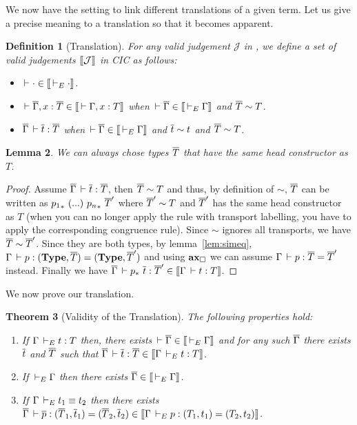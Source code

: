 \documentclass[11pt]{article}
\theoremstyle{plain}
\newtheorem{theorem}{Theorem}%
\newtheorem{lemma}[theorem]{Lemma}
\newtheorem{definition}[theorem]{Definition}
\theoremstyle{remark}
\begin{document}
We now have the setting to link different translations of a given term.
Let us give a precise meaning to a translation so that it becomes apparent.

\begin{definition}[Translation]
  For any valid judgement $\mathcal{J}$ in \CCe, we define a set of valid
  judgements $\mathopen{{[\kern-0.14em[}} \mathcal{J} \mathclose{{]\kern-0.14em]}}$ in CIC as follows:
  \leavevmode
  \begin{itemize}
    \item $\,\vdash \cdot \in \mathopen{{[\kern-0.14em[}} \,\vdash_E \cdot \mathclose{{]\kern-0.14em]}}$.
    \item $\,\vdash \overline{\Gamma}, x:\overline{T} \in \mathopen{{[\kern-0.14em[}} \,\vdash \Gamma, x:T \mathclose{{]\kern-0.14em]}}$
          when $\,\vdash \overline{\Gamma} \in \mathopen{{[\kern-0.14em[}} \,\vdash_E \Gamma \mathclose{{]\kern-0.14em]}}$ and
          $\overline{T} \sim T$.
    \item $\overline{\Gamma} \,\vdash \overline{t} : \overline{T}$ when
          $\,\vdash \overline{\Gamma} \in \mathopen{{[\kern-0.14em[}} \,\vdash_E \Gamma \mathclose{{]\kern-0.14em]}}$ and
          $\overline{t} \sim t$ and $\overline{T} \sim T$.
  \end{itemize}
\end{definition}

\begin{lemma}
  \label{lem:choice}
  We can always chose types $\overline{T}$ that have the same head constructor
  as $T$.
\end{lemma}

\begin{proof}
  Assume $\overline{\Gamma} \,\vdash \overline{t} : \overline{T}$, then $\overline{T} \sim T$ and thus,
  by definition of $\sim$, $\overline{T}$ can be written as
  ${p_1}_*\ (...)\ {p_n}_*\ \overline{T}'$ where $\overline{T}' \sim T$ and $\overline{T}'$ has
  the same head constructor as $T$ (when you can no longer apply the rule
  with transport labelling, you have to apply the corresponding congruence
  rule).
  Since $\sim$ ignores all transports, we have $\overline{T} \sim \overline{T}'$.
  Since they are both types, by lemma~\ref{lem:simeq},
  $\Gamma \,\vdash p : (\operatorname{\mathbf{Type}},\overline{T}) = (\operatorname{\mathbf{Type}},\overline{T}')$ and using $\operatorname{\mathbf{ax}_\square}$ we can
  assume $\Gamma \,\vdash p : \overline{T} = \overline{T}'$ instead.
  Finally we have $\overline{\Gamma} \,\vdash p_*\ \overline{t} : \overline{T}' \in \mathopen{{[\kern-0.14em[}} \Gamma \,\vdash t : T \mathclose{{]\kern-0.14em]}}$.
\end{proof}

We now prove our translation.

\begin{theorem}[Validity of the Translation]
  \label{thm:valid}
  The following properties hold:
  \leavevmode
  \begin{enumerate}
    \item If $\Gamma \,\vdash_E t : T$ then, there exists
    $\,\vdash \overline{\Gamma} \in \mathopen{{[\kern-0.14em[}} \,\vdash_E \Gamma \mathclose{{]\kern-0.14em]}}$
    and for any such $\overline{\Gamma}$ there exists $\overline{t}$ and $\overline{T}$ such
    that $\overline{\Gamma} \,\vdash \overline{t} : \overline{T} \in \mathopen{{[\kern-0.14em[}} \Gamma \,\vdash_E t : T \mathclose{{]\kern-0.14em]}}$.
    \item If $\,\vdash_E \Gamma$ then there exists $\overline{\Gamma} \in \mathopen{{[\kern-0.14em[}} \,\vdash_E \Gamma \mathclose{{]\kern-0.14em]}}$.
    \item If $\Gamma \,\vdash_E t_1 \equiv t_2$ then there exists
    $\overline{\Gamma} \,\vdash \overline{p} : (\overline{T}_1,\overline{t}_1) = (\overline{T}_2,\overline{t}_2) \in
    \mathopen{{[\kern-0.14em[}} \Gamma \,\vdash_E p : (T_1,t_1) = (T_2,t_2) \mathclose{{]\kern-0.14em]}}$.
  \end{enumerate}
\end{theorem}
\end{document}
